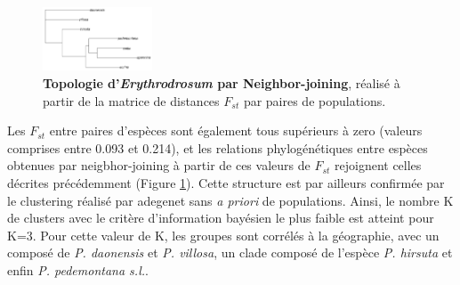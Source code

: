 \begin{figure}
	\vspace{-20pt}
	\begin{center}
	\includegraphics[width=0.29\textwidth]{fig/topologie.png}
	\end{center}
	\caption{\textbf{Topologie d'\textit{Erythrodrosum} par Neighbor-joining}, réalisé à partir de la matrice de distances $F_{st}$ par paires de populations.}
    \label{topologie}
\end{figure}

Les $F_{st}$ entre paires d'espèces sont également tous supérieurs à zero (valeurs comprises entre 0.093 et 0.214), et les relations phylogénétiques entre espèces obtenues par neigbhor-joining à partir de ces valeurs de $F_{st}$ rejoignent celles décrites précédemment (Figure \ref{topologie}).
Cette structure est par ailleurs confirmée par le clustering réalisé par adegenet sans \textit{a priori} de populations. Ainsi, le nombre K de clusters avec le critère d'information bayésien le plus faible est atteint pour K=3.  Pour cette valeur de K, les groupes sont corrélés à la géographie, avec un  composé de \textit{P. daonensis} et \textit{P. villosa}, un clade composé de l'espèce \textit{P. hirsuta} et enfin \textit{P. pedemontana s.l.}.
